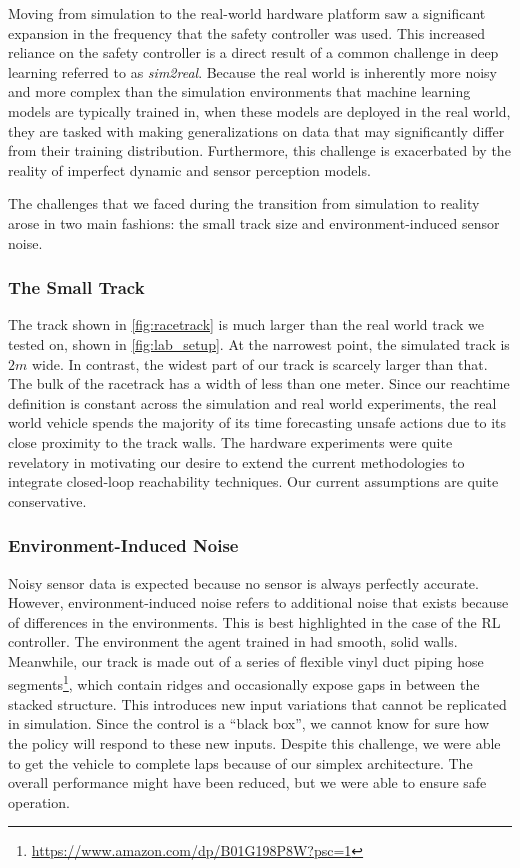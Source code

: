 \documentclass[manuscript,screen,review]{acmart}
\begin{document}
Moving from simulation to the real-world hardware platform saw a significant expansion in the frequency that the safety controller was used. This increased reliance on the safety controller is a direct result of a common challenge in deep learning referred to as \emph{sim2real}. Because the real world is inherently more noisy and more complex than the simulation environments that machine learning models are typically trained in, when these models are deployed in the real world, they are tasked with making generalizations on data that may significantly differ from their training distribution. Furthermore, this challenge is exacerbated by the reality of imperfect dynamic and sensor perception models\cite{ivanov2020case}.

The challenges that we faced during the transition from simulation to reality arose in two main fashions: the small track size and environment-induced sensor noise.

\subsubsection{The Small Track} The track shown in \ref{fig:racetrack} is much larger than the real world track we tested on, shown in \ref{fig:lab_setup}. At the narrowest point, the simulated track is $2m$ wide. In contrast, the widest part of our track is scarcely larger than that. The bulk of the racetrack has a width of less than one meter. Since our reachtime definition is constant across the simulation and real world experiments, the real world vehicle spends the majority of its time forecasting unsafe actions due to its close proximity to the track walls. The hardware experiments were quite revelatory in motivating our desire to extend the current methodologies to integrate closed-loop reachability techniques. Our current assumptions are quite conservative. 

\subsubsection{Environment-Induced Noise} Noisy sensor data is expected because no sensor is always perfectly accurate. However, environment-induced noise refers to additional noise that exists because of differences in the environments. This is best highlighted in the case of the RL controller. The environment the agent trained in had smooth, solid walls. Meanwhile, our track is made out of a series of flexible vinyl duct piping hose segments\footnote{\url{https://www.amazon.com/dp/B01G198P8W?psc=1}}, which contain ridges and occasionally expose gaps in between the stacked structure. This introduces new input variations that cannot be replicated in simulation. Since the control is a ``black box'', we cannot know for sure how the policy will respond to these new inputs. Despite this challenge, we were able to get the vehicle to complete laps because of our simplex architecture. The overall performance might have been reduced, but we were able to ensure safe operation.
\end{document}
